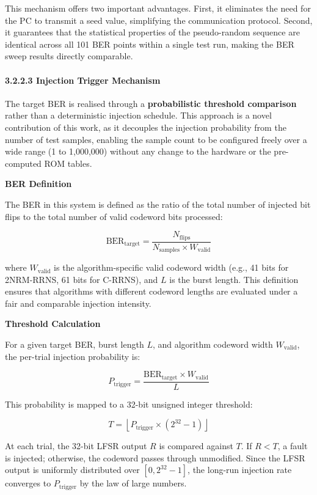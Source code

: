This mechanism offers two important advantages. First, it eliminates the
need for the PC to transmit a seed value, simplifying the communication
protocol. Second, it guarantees that the statistical properties of the
pseudo-random sequence are identical across all 101 BER points within a
single test run, making the BER sweep results directly comparable.

\paragraph{3.2.2.3 Injection Trigger
Mechanism}\label{injection-trigger-mechanism}

The target BER is realised through a \textbf{probabilistic threshold
comparison} rather than a deterministic injection schedule. This
approach is a novel contribution of this work, as it decouples the
injection probability from the number of test samples, enabling the
sample count to be configured freely over a wide range (1 to 1,000,000)
without any change to the hardware or the pre-computed ROM tables.

\textbf{BER Definition}

The BER in this system is defined as the ratio of the total number of
injected bit flips to the total number of valid codeword bits processed:

\[\text{BER}_{\text{target}} = \frac{N_{\text{flips}}}{N_{\text{samples}} \times W_{\text{valid}}}\]

where \(W_{\text{valid}}\) is the algorithm-specific valid codeword
width (e.g., 41 bits for 2NRM-RRNS, 61 bits for C-RRNS), and \(L\) is
the burst length. This definition ensures that algorithms with different
codeword lengths are evaluated under a fair and comparable injection
intensity.

\textbf{Threshold Calculation}

For a given target BER, burst length \(L\), and algorithm codeword width
\(W_{\text{valid}}\), the per-trial injection probability is:

\[P_{\text{trigger}} = \frac{\text{BER}_{\text{target}} \times W_{\text{valid}}}{L}\]

This probability is mapped to a 32-bit unsigned integer threshold:

\[T = \left\lfloor P_{\text{trigger}} \times (2^{32} - 1) \right\rfloor\]

At each trial, the 32-bit LFSR output \(R\) is compared against \(T\).
If \(R < T\), a fault is injected; otherwise, the codeword passes
through unmodified. Since the LFSR output is uniformly distributed over
\([0, 2^{32}-1]\), the long-run injection rate converges to
\(P_{\text{trigger}}\) by the law of large numbers.

